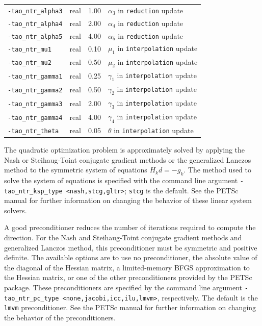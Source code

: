 \documentclass[]{book}
\begin{document}
\begin{table}[h]
\begin{tabular}{l|p{1.5in}|l|p{2.0in}}
{\tt -tao\_ntr\_alpha3} & real & 1.00 & $\alpha_3$ in {\tt reduction} update \\
{\tt -tao\_ntr\_alpha4} & real & 2.00 & $\alpha_4$ in {\tt reduction} update \\
{\tt -tao\_ntr\_alpha5} & real & 4.00 & $\alpha_5$ in {\tt reduction} update \\
{\tt -tao\_ntr\_mu1} & real & 0.10 & $\mu_1$ in {\tt interpolation} update \\
{\tt -tao\_ntr\_mu2} & real & 0.50 & $\mu_2$ in {\tt interpolation} update \\
{\tt -tao\_ntr\_gamma1} & real & 0.25 & $\gamma_1$ in {\tt interpolation} update \\
{\tt -tao\_ntr\_gamma2} & real & 0.50 & $\gamma_2$ in {\tt interpolation} update \\
{\tt -tao\_ntr\_gamma3} & real & 2.00 & $\gamma_3$ in {\tt interpolation} update \\
{\tt -tao\_ntr\_gamma4} & real & 4.00 & $\gamma_4$ in {\tt interpolation} update \\
{\tt -tao\_ntr\_theta} & real & 0.05 & $\theta$ in {\tt interpolation} update \\
\hline
\end{tabular}
\end{table}
\afterpage{\clearpage}

The quadratic optimization problem is approximately solved by applying
the Nash or Steihaug-Toint conjugate gradient methods or the 
generalized Lanczos 
method to the symmetric system of equations $H_k d = -g_k$.  The method 
used to solve the system of equations is specified with the command line
argument {\tt -tao\_ntr\_ksp\_type <nash,stcg,gltr>}; {\tt stcg} is the default.  
See the PETSc manual for further information on changing the behavior of 
these linear system solvers.  

A good preconditioner reduces the number of iterations required to
compute the direction.  For the Nash and Steihaug-Toint conjugate gradient
methods and generalized Lanczos method, this preconditioner must be
symmetric and positive definite.  The available options are to use no
preconditioner, the absolute value of the diagonal of the Hessian
matrix, a limited-memory BFGS approximation to the Hessian matrix, or
one of the other preconditioners provided by the PETSc package.  These
preconditioners are specified by the command line argument 
{\tt -tao\_ntr\_pc\_type <none,jacobi,icc,ilu,lmvm>}, respectively.  The
default is the {\tt lmvm} preconditioner. See the PETSc manual 
for further information on changing the behavior of the preconditioners.
\end{document}
